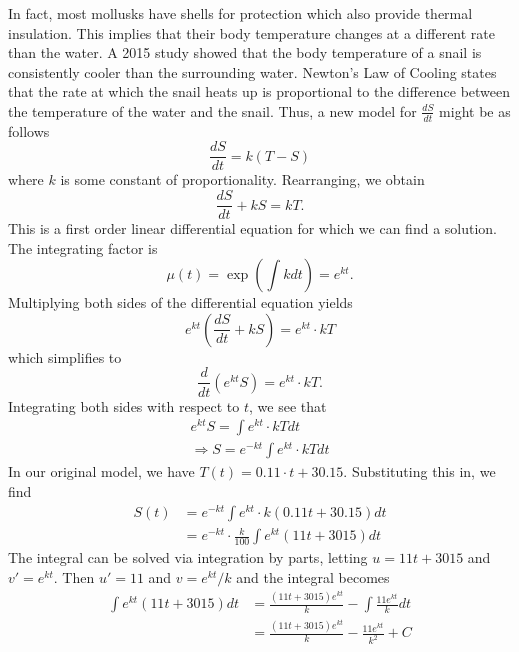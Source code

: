 \documentclass{article}
\begin{document}
   In fact, most mollusks have shells for protection which also provide thermal insulation.
   This implies that their body temperature changes at a different rate than the water.
   A 2015 study showed that the body temperature of a snail is consistently cooler than the surrounding water.
   Newton's Law of Cooling states that the rate at which the snail heats up is proportional to the difference between the temperature of the water and the snail.
   Thus, a new model for \(\frac{dS}{dt}\) might be as follows
   \begin{equation*}
     \frac{dS}{dt} = k (T - S)
   \end{equation*}
   where \(k\) is some constant of proportionality.
   Rearranging, we obtain
   \begin{equation*}
     \frac{dS}{dt} + kS = kT.
   \end{equation*}
   This is a first order linear differential equation for which we can find a solution.
   The integrating factor is
   \begin{equation*}
     \mu(t) = \exp \left( \int k dt \right) = e^{kt}.
   \end{equation*}
   Multiplying both sides of the differential equation yields
   \begin{equation*}
     e^{kt} \left( \frac{dS}{dt} + kS \right) = e^{kt} \cdot kT
   \end{equation*}
   which simplifies to
   \begin{equation*}
     \frac{d}{dt} \left( e^{kt} S \right) = e^{kt} \cdot kT.
   \end{equation*}
   Integrating both sides with respect to \(t\), we see that
   \begin{gather*}
     e^{kt} S = \int e^{kt} \cdot kT dt \\
     \Longrightarrow S = e^{-kt} \int e^{kt} \cdot kT dt
   \end{gather*}
   In our original model, we have \(T(t) = 0.11 \cdot t + 30.15\).
   Substituting this in, we find
   \begin{align*}
     S(t) &= e^{-kt} \int e^{kt} \cdot k(0.11t + 30.15) dt \\
     &= e^{-kt} \cdot \frac{k}{100} \int e^{kt} (11t + 3015) dt
   \end{align*}
   The integral can be solved via integration by parts, letting \(u = 11t + 3015\) and \(v' = e^{kt}\). Then \(u' = 11\) and \(v = e^{kt} / k\) and the integral becomes
   \begin{align*}
     \int e^{kt} (11t + 3015) dt &= \frac{(11t + 3015) e^{kt}}{k} - \int \frac{11 e^{kt}}{k} dt \\
     &= \frac{(11t + 3015) e^{kt}}{k} - \frac{11 e^{kt}}{k^{2}} + C
   \end{align*}
\end{document}
